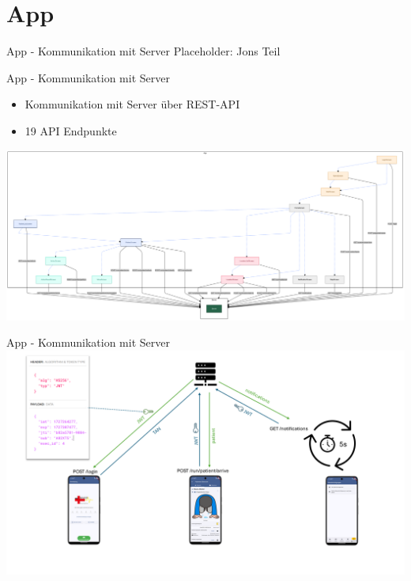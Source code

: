 %
%
\section{App}

\begin{frame}{App - Kommunikation mit Server}
	Placeholder: Jons Teil
\end{frame}

\begin{frame}{App - Kommunikation mit Server}
	\begin{itemize}
		\item Kommunikation mit Server über REST-API
		\item 19 API Endpunkte
	\end{itemize}
	\centering
	\includegraphics[width=1.0\textwidth]{images/app/server_endpoints.png}
\end{frame}

\begin{frame}{App - Kommunikation mit Server}
	\centering
	\includegraphics[width=1.0\textwidth]{images/app/api_flow.png}
\end{frame}
